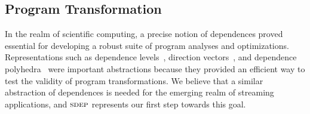 \subsection{Program Transformation}

In the realm of scientific computing, a precise notion of dependences
proved essential for developing a robust suite of program analyses and
optimizations.  Representations such as dependence levels~\cite{AK82},
direction vectors~\cite{wolfe82}, and dependence
polyhedra~\cite{Irig88} were important abstractions because they
provided an efficient way to test the validity of program
transformations.  We believe that a similar abstraction of dependences
is needed for the emerging realm of streaming applications, and
$\textsc{sdep}$ represents our first step towards this goal.

